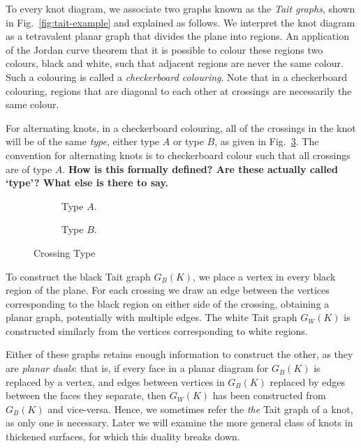 \documentclass[12pt]{report}
\newcommand{\notered}[1]{{\color{Red} \textbf{#1}}}
\begin{document}
To every knot diagram, we associate two graphs known as the \textit{Tait graphs}, shown in Fig.~\ref{fig:tait-example} and explained as follows. We interpret the knot diagram as a tetravalent planar graph that divides the plane into regions. An application of the Jordan curve theorem that it is possible to colour these regions two colours, black and white, such that adjacent regions are never the same colour. Such a colouring is called a \textit{checkerboard colouring}. Note that in a checkerboard colouring, regions that are diagonal to each other at crossings are necessarily the same colour.

For alternating knots, in a checkerboard colouring, all of the crossings in the knot will be of the same \textit{type}, either type $A$ or type $B$, as given in Fig.~\ref{fig:crossing-type}. The convention for alternating knots is to checkerboard colour such that all crossings are of type $A$. \notered{How is this formally defined? Are these actually called `type'? What else is there to say.}

\begin{figure}[hbt]
	\centering
	\hspace*{\fill}
	\begin{subfigure}[b]{0.4 \textwidth}
		\centering
		\def\svgscale{0.28}
		
		\caption{Type $A$.}
		\label{fig:type-a}
	\end{subfigure}
	\hspace*{\fill} \hspace*{\fill}	\hspace*{\fill}
	\begin{subfigure}[b]{0.4 \textwidth}
		\centering
		\def\svgscale{0.28}
		
		\caption{Type $B$.}
		\label{fig:type-b}
	\end{subfigure}
	\hspace*{\fill} 
	\caption{Crossing Type}
	\label{fig:crossing-type}
\end{figure}

To construct the black Tait graph $G_{B}(K)$, we place a vertex in every black region of the plane. For each crossing we draw an edge between the vertices corresponding to the black region on either side of the crossing, obtaining a planar graph, potentially with multiple edges. The white Tait graph $G_{W}(K)$ is constructed similarly from the vertices corresponding to white regions.

Either of these graphs retains enough information to construct the other, as they are \textit{planar duals}: that is, if every face in a planar diagram for $G_{B}(K)$ is replaced by a vertex, and edges between vertices in $G_{B}(K)$ replaced by edges between the faces they separate, then $G_{W}(K)$ has been constructed from $G_{B}(K)$ and vice-versa. Hence, we sometimes refer the \textit{the} Tait graph of a knot, as only one is necessary. Later we will examine the more general class of knots in thickened surfaces, for which this duality breaks down.
\end{document}
